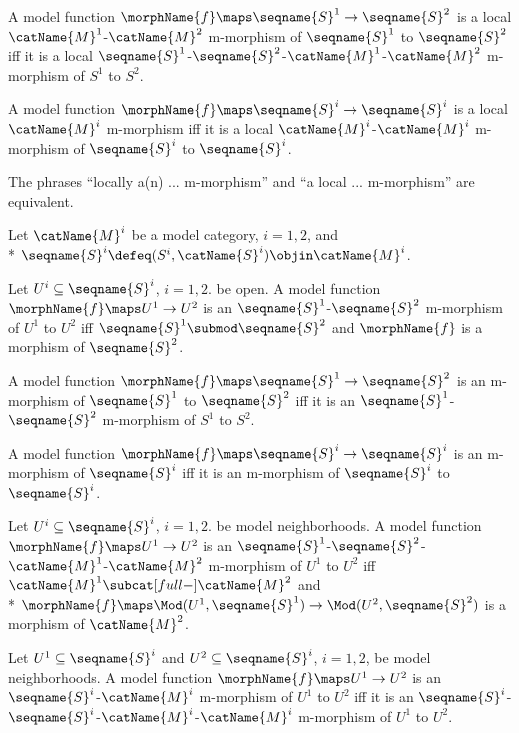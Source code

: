 \documentclass{article}
\begin{document}
\begin{definition}
A model function $\morphName{f} \maps \seqname{S}^1 \to \seqname{S}^2$ is
a local $\catName{M}^1$-$\catName{M}^2$ m-morphism of $\seqname{S}^1$ to
$\seqname{S}^2$ iff it is a local
$\seqname{S}^1$-$\seqname{S}^2$-$\catName{M}^1$-$\catName{M}^2$
m-morphism of $S^1$ to $S^2$.\footnotemark[\value{fn:nonmodel}]

A model function $\morphName{f} \maps \seqname{S}^i \to \seqname{S}^i$ is
a local $\catName{M}^i$ m-morphism iff it is a local
$\catName{M}^i$-$\catName{M}^i$ m-morphism of $\seqname{S}^i$ to
$\seqname{S}^i$.

The phrases {\textquotedblleft}locally a(n) ...
m-morphism{\textquotedblright} and {\textquotedblleft}a local ...
m-morphism{\textquotedblright} are equivalent.
\end{definition}

\begin{definition}[M-morphisms]
\label{def:modMmorph}
Let $\catName{M}^i$ be a model category, $i=1,2$, and \\*
$\seqname{S}^i \defeq (S^i, \catName{S}^i) \objin \catName{M}^i$.

Let $U^i \subseteq \seqname{S}^i$, $i=1,2$. be open. A model
function $\morphName{f} \maps U^1 \to U^2$ is an
$\seqname{S}^1$-$\seqname{S}^2$ m-morphism of $U^1$ to $U^2$ iff
$\seqname{S}^1 \submod \seqname{S}^2$ and $\morphName{f}$ is a morphism
of $\seqname{S}^2$.

A model function $\morphName{f} \maps \seqname{S}^1 \to \seqname{S}^2$ is
an m-morphism of $\seqname{S}^1$ to $\seqname{S}^2$ iff it is an
$\seqname{S}^1$-$\seqname{S}^2$ m-morphism of $S^1$ to
$S^2$.\footnotemark[\value{fn:nonmodel}]

A model function $\morphName{f} \maps \seqname{S}^i \to \seqname{S}^i$ is
an m-morphism of $\seqname{S}^i$ iff it is an m-morphism
of $\seqname{S}^i$ to $\seqname{S}^i$.

Let $U^i \subseteq \seqname{S}^i$, $i=1,2$. be model neighborhoods. A
model function $\morphName{f} \maps U^1 \to U^2$ is an
$\seqname{S}^1$-$\seqname{S}^2$-$\catName{M}^1$-$\catName{M}^2$
m-morphism of $U^1$ to $U^2$ iff
$\catName{M}^1 \subcat[full-] \catName{M}^2$ and \\*
$
  \morphName{f} \maps \Mod(U^1,\seqname{S}^1)
  \to \Mod(U^2,\seqname{S}^2)
$
is a morphism of $\catName{M}^2$.

Let $U^1 \subseteq \seqname{S}^i$ and $U^2 \subseteq \seqname{S}^i$,
$i=1,2$, be model neighborhoods. A model function
$\morphName{f} \maps U^1 \to U^2$ is an $\seqname{S}^i$-$\catName{M}^i$
m-morphism of $U^1$ to $U^2$ iff it is an
$\seqname{S}^i$-$\seqname{S}^i$-$\catName{M}^i$-$\catName{M}^i$
m-morphism of $U^1$ to $U^2$.


\end{definition}
\end{document}
